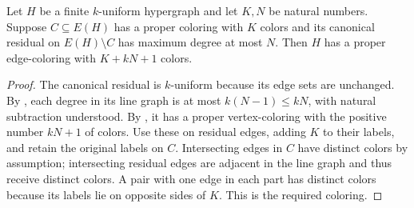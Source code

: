 \begin{lemma}
Let $H$ be a finite $k$-uniform hypergraph and let $K,N$ be natural
numbers. Suppose $C\subseteq E(H)$ has a proper coloring with $K$ colors
and its canonical residual on $E(H)\setminus C$ has maximum degree at
most $N$. Then $H$ has a proper edge-coloring with $K+kN+1$ colors.
\end{lemma}
\begin{proof}
The canonical residual is $k$-uniform because its edge sets are unchanged.
By , each degree in its line
graph is at most $k(N-1)\le kN$, with natural subtraction understood.
By , it has a proper vertex-coloring
with the positive number $kN+1$ of colors. Use these on residual edges,
adding $K$ to their labels, and retain the original labels on $C$.
Intersecting edges in $C$ have distinct colors by assumption;
intersecting residual edges are adjacent in the line graph and thus
receive distinct colors. A pair with one edge in each part has distinct
colors because its labels lie on opposite sides of $K$. This is the
required  coloring.
\end{proof}
